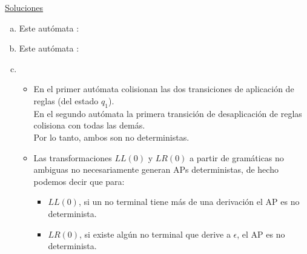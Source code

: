 \documentclass[dcc]{fcfmcourse}
\begin{document}
\newpage
\begin{center}
{\huge \underline{Soluciones}}
\begin{problems}
\problem 
\begin{enumerate}[a)]
    \item Este autómata : \\
    \item Este autómata : \\
    \item 
    \begin{itemize}
        \item En el primer autómata colisionan las dos transiciones de aplicación de reglas (del estado $q_{1}$).\\
        En el segundo autómata la primera transición de desaplicación de reglas colisiona con todas las demás.\\
        Por lo tanto, ambos son no deterministas.
        \item Las transformaciones $LL(0)$ y $LR(0)$ a partir de gramáticas no ambiguas no necesariamente generan APs deterministas, de hecho podemos decir que para:
        \begin{itemize}
            \item $LL(0)$, si un no terminal tiene más de una derivación el AP es no determinista.
            \item $LR(0)$, si existe algún no terminal que derive a $\epsilon$, el AP es no determinista.
        \end{itemize}

\end{itemize}
\end{enumerate}
\end{problems}
\end{center}
\end{document}
